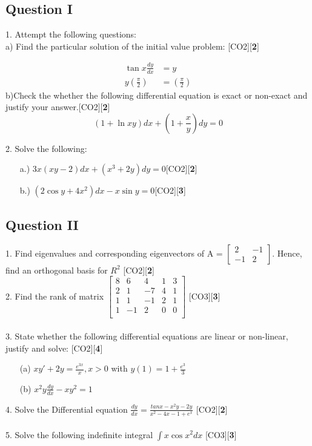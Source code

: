 \documentclass{article}
\begin{document}
\subsection*{Question I}
1. Attempt the following questions:\\
a) Find the particular solution of the initial value problem: \hfill [CO2][{\bf 2}]
	
	\begin{align*}
	\tan x\frac{dy}{dx}&=y
	\\y(\frac{\pi}{2})&=(\frac{\pi}{2})
	\end{align*} 
\noindent b)Check the whether the following differential equation is exact or non-exact and justify your answer.\hfill [CO2][{\bf 2}]
	 \begin{equation*}
	 (1 + \ln xy)dx + (1 + \frac{x}{y})dy = 0
	\end{equation*}

2. Solve the following:
\begin{itemize}
 \item[a.)] $ 3x(xy - 2)dx + (x^3 + 2y)dy = 0 $\hfill [CO2][{\bf 2}]
 \item[b.)] $ (2\cos y +4x^2)dx - x \sin y = 0$\hfill [CO2][{\bf 3}]
\end{itemize}
\pagebreak
\vspace{-10 cm}
\subsection*{Question II}
1. Find eigenvalues and corresponding eigenvectors of A = 
	$\begin{bmatrix}
	2 & -1 \\ -1 & 2
	\end{bmatrix}$. Hence, find an orthogonal basis for $ R^2$
	\hfill [CO2][{\bf 2}]\\
2. Find the rank of matrix
	$\begin{bmatrix}
	8 & 6 & 4 & 1 & 3\\
	2 & 1 & -7 & 4 & 1\\	
	1 & 1 & -1 & 2 & 1\\
	1 & -1 & 2 & 0 & 0\\
	\end{bmatrix}$ 
	\hfill [CO3][{\bf 3}]\\\\
3. State whether the following differential equations are linear or non-linear, justify and solve:  \hfill [CO2][{\bf 4}]\\
	\begin{itemize}
	\item[(a)] $ xy' + 2y = \frac{e^{3x}}{x}, x>0$ with $y(1)=1+\frac{e^3}{3}$
	\item[(b)] $x^2y\frac{dy}{dx}-xy^2=1$
	\end{itemize}
4. Solve the Differential equation 
$\frac{dy}{dx} = \frac{tanx-x^2y-2y}{x^2-4x-1+e^x}$ \hfill [CO2][{\bf 2}] \\\\
5. Solve the following indefinite integral
$\int x \cos{x^2} dx$  \hfill [CO3][{\bf 3}]\\
\end{document}
